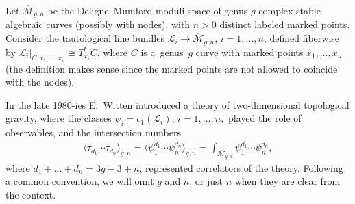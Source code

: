 Let $\overline{\mathcal{M}}_{g,n}$ be the Deligne--Mumford
moduli space of genus $g$ complex stable algebraic curves
(possibly with nodes), with $n>0$ distinct labeled marked
points. Consider the tautological line bundles
$\mathcal{L}_i\to\overline{\mathcal{M}}_{g,n}$, $i=1,\dots,n$, defined fiberwise by
$\mathcal{L}_i|_{C,x_1,\dots,x_n} \cong
T^*_{x_i}C$, where $C$ is a~genus~$g$ curve with marked
points $x_1,\dots,x_n$ (the definition makes sense since
the marked points are not allowed to coincide with the nodes).

In the late 1980-ies E.~Witten \cite{Witten} introduced a
theory of two-dimensional topological gravity, where the
classes $\psi_i=c_1(\mathcal{L}_i)$, $i=1,\dots,n,$ played
the role of observables, and the intersection numbers
\begin{gather*}
\langle\tau_{d_1}\cdots\tau_{d_n}\rangle_{g,n}
=\big\langle\psi_1^{d_1}\cdots\psi_n^{d_n}\big\rangle_{g,n}
=\int_{\overline{\mathcal{M}}_{g,n}}
\psi_1^{d_1}\cdots\psi_n^{d_n} ,
\end{gather*}
where $d_1+\dots +d_n=3g-3+n$, represented correlators of
the theory. Following a common convention, we will omit $g$
and $n$, or just $n$ when they are clear from the context.
